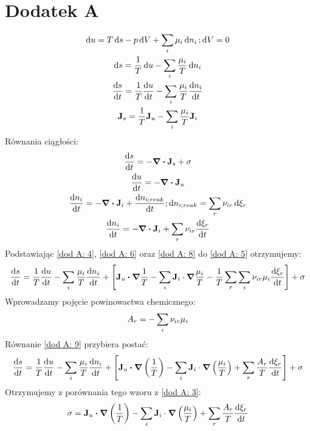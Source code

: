 \documentclass[10pt, a4paper, twoside, onecolumn]{article}
\numberwithin{equation}{section}
\begin{document}
	\section*{Dodatek A}
	\begin{gather}
		\dd{u}=T\dd{s}-p\dd{V}+\sum_{i}\mu_{i}\dd{n_{i}}; \dd{V}=0 \label{dod A: 1} \\
		\dd{s}=\frac{1}{T}\dd{u}-\sum_{i}\frac{\mu_{i}}{T}\dd{n_{i}} \label{dod A: 2} \\
		\dv{s}{t}=\frac{1}{T}\dv{u}{t}-\sum_{i}\frac{\mu_{i}}{T}\dv{n_{i}}{t} \label{dod A: 3} \\
		\vb{J}_{s}=\frac{1}{T}\vb{J}_{u}-\sum_{i}\frac{\mu_{i}}{T}\vb{J}_{i} \label{dod A: 4}
	\end{gather}
	Równania ciągłości:
	\begin{gather}
		\dv{s}{t}=-\div{\vb{J}_{s}}+\sigma \label{dod A: 5} \\
		\dv{u}{t}=-\div{\vb{J}_{u}} \label{dod A: 6} \\
		\dv{n_{i}}{t}=-\div{\vb{J}_{i}}+\dv{n_{i;reak}}{t}; \dd{n_{i;reak}}=\sum_{r}\nu_{ir}\dd{\xi_{r}} \label{dod A: 7} \\
		\dv{n_{i}}{t}=-\div{\vb{J}_{i}}+\sum_{r}\nu_{ir}\dv{\xi_{r}}{t} \label{dod A: 8}
	\end{gather}
	Podstawiając \eqref{dod A: 4}, \eqref{dod A: 6} oraz \eqref{dod A: 8} do \eqref{dod A: 5} otrzymujemy: 
	\begin{equation} \label{dod A: 9}
		\dv{s}{t}=\frac{1}{T}\dv{u}{t}-\sum_{i}\frac{\mu_{i}}{T}\dv{n_{i}}{t}+\left[\vb{J}_{u}\vdot\grad{\frac{1}{T}}-\sum_{i}\vb{J}_{i}\cdot\grad{\frac{\mu_{i}}{T}}-\frac{1}{T}\sum_{r}\sum_{i}\nu_{ir}\mu_{i}\dv{\xi_{r}}{t}\right]+\sigma
	\end{equation}
	Wprowadzamy pojęcie powinowactwa chemicznego: 
	\begin{equation}
		A_{r}=-\sum_{i}\nu_{ir}\mu_{i} \\
	\end{equation}
	Równanie \eqref{dod A: 9} przybiera postać:
	\begin{equation}
		\dv{s}{t}=\frac{1}{T}\dv{u}{t}-\sum_{i}\frac{\mu_{i}}{T}\dv{n_{i}}{t}+\left[\vb{J}_{u}\vdot\grad{\left(\frac{1}{T}\right)}-\sum_{i}\vb{J}_{i}\cdot\grad{\left(\frac{\mu_{i}}{T}\right)}+\sum_{r}\frac{A_{r}}{T}\dv{\xi_{r}}{t}\right]+\sigma
	\end{equation}
	Otrzymujemy z porównania tego wzoru z \eqref{dod A: 3}:
	\begin{equation}
		\sigma=\vb{J}_{u}\vdot\grad{\left(\frac{1}{T}\right)}-\sum_{i}\vb{J}_{i}\cdot\grad{\left(\frac{\mu_{i}}{T}\right)}+\sum_{r}\frac{A_{r}}{T}\dv{\xi_{r}}{t}
	\end{equation}
\end{document}
